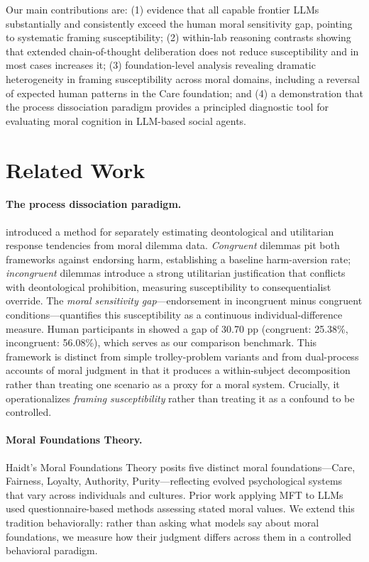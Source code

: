 \documentclass{article}
\begin{document}
Our main contributions are: (1) evidence that all capable frontier LLMs substantially and consistently exceed the human moral sensitivity gap, pointing to systematic framing susceptibility; (2) within-lab reasoning contrasts showing that extended chain-of-thought deliberation does not reduce susceptibility and in most cases increases it; (3) foundation-level analysis revealing dramatic heterogeneity in framing susceptibility across moral domains, including a reversal of expected human patterns in the Care foundation; and (4) a demonstration that the process dissociation paradigm provides a principled diagnostic tool for evaluating moral cognition in LLM-based social agents.

\section{Related Work}

\paragraph{The process dissociation paradigm.}
\citet{conway2013deontological} introduced a method for separately estimating deontological and utilitarian response tendencies from moral dilemma data. \emph{Congruent} dilemmas pit both frameworks against endorsing harm, establishing a baseline harm-aversion rate; \emph{incongruent} dilemmas introduce a strong utilitarian justification that conflicts with deontological prohibition, measuring susceptibility to consequentialist override. The \emph{moral sensitivity gap}—endorsement in incongruent minus congruent conditions—quantifies this susceptibility as a continuous individual-difference measure. Human participants in \citet{conway2013deontological} showed a gap of 30.70 pp (congruent: 25.38\%, incongruent: 56.08\%), which serves as our comparison benchmark. This framework is distinct from simple trolley-problem variants \citep{foot1967problem, thomson1985trolley} and from dual-process accounts of moral judgment \citep{greene2001fmri, cushman2013action} in that it produces a within-subject decomposition rather than treating one scenario as a proxy for a moral system. Crucially, it operationalizes \emph{framing susceptibility} rather than treating it as a confound to be controlled.

\paragraph{Moral Foundations Theory.}
Haidt's Moral Foundations Theory \citep{haidt2001emotional, graham2009liberals} posits five distinct moral foundations—Care, Fairness, Loyalty, Authority, Purity—reflecting evolved psychological systems that vary across individuals and cultures. Prior work applying MFT to LLMs \citep{abdulhai2023moral} used questionnaire-based methods assessing stated moral values. We extend this tradition behaviorally: rather than asking what models say about moral foundations, we measure how their judgment differs across them in a controlled behavioral paradigm.
\end{document}
